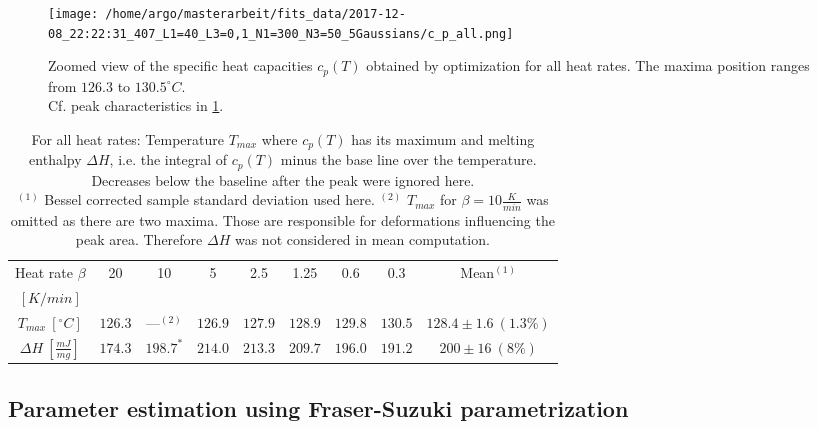 \documentclass{scrartcl}[12pt, halfparskip]
\numberwithin{equation}{section}
\numberwithin{figure}{section}
\numberwithin{table}{section}
\begin{document}
\begin{figure}[H]
	\centering
	\texttt{[image: /home/argo/masterarbeit/fits\_data/2017-12-08\_22:22:31\_407\_L1=40\_L3=0,1\_N1=300\_N3=50\_5Gaussians/c\_p\_all.png]}
	\caption{Zoomed view of the specific heat capacities $c_p(T)$ obtained by optimization for all heat rates. The maxima position ranges from $126.3$ to $130.5^{\circ}C$. \\
	Cf. peak characteristics in \cref{tab:eval_table_Tmax_deltaH_5Gaussians}.}
	\label{fig:5Gaussians_all_c_p}
\end{figure}


\begin{table}[H]
	\centering
	\begin{tabular}{| c | c | c | c | c | c | c | c || c |} \hline
		Heat rate $\beta$ & 20 & 10 & 5 & 2.5 & 1.25 & 0.6 & 0.3 & Mean$^{(1)}$ \\
		$[K/min]$ & & & & & & & & \\ \hline
		$T_{max} \ [^{\circ}C]$ & $126.3$ & ---$^{(2)}$ & $126.9$ & $127.9$ & $128.9$ & $129.8$ & $130.5$ & $128.4 \pm 1.6 \ (1.3\%)$ \\[0.7ex]
		$\Delta H \ [\frac{mJ}{mg}]$ & $174.3$ & $198.7^*$ & $214.0$ & $213.3$ & $209.7$ & $196.0$ & $191.2$ & $200 \pm 16 \ (8\%)$ \\ \hline
	\end{tabular}
	\caption{For all heat rates: Temperature $T_{max}$ where $c_p(T)$ has its maximum and melting enthalpy $\Delta H$, i.e. the integral of $c_p(T)$ minus the base line over the temperature. Decreases below the baseline after the peak were ignored here. \\
	$^{(1)}$ Bessel corrected sample standard deviation used here. $^{(2)}$ $T_{max}$ for $\beta=10\frac{K}{min}$ was omitted as there are two maxima. Those are responsible for deformations influencing the peak area. Therefore $\Delta H$ was not considered in mean computation. \\
	}
	\label{tab:eval_table_Tmax_deltaH_5Gaussians}
\end{table}


\subsection{Parameter estimation using Fraser-Suzuki parametrization}
\label{sec:param_estimation_fs}
\end{document}
